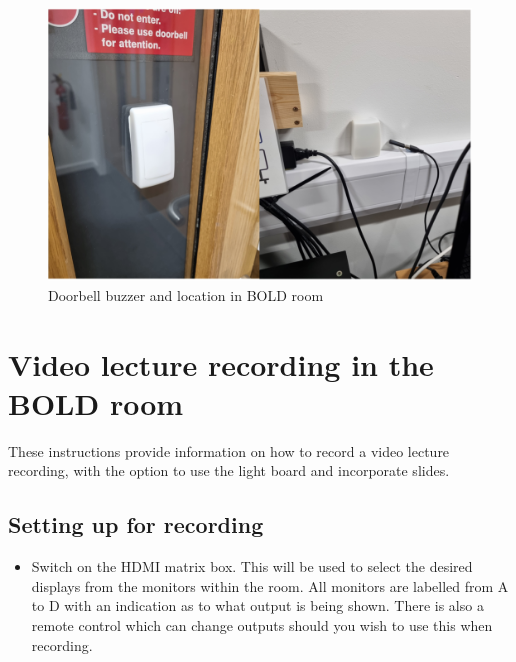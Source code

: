 \documentclass[
]{book}
\providecommand{\tightlist}{%
  \setlength{\itemsep}{0pt}\setlength{\parskip}{0pt}}
\begin{document}
\begin{figure}

{\centering \includegraphics[width=1\linewidth]{Door_buzzer} 

}

\caption{Doorbell buzzer and location in BOLD room}\label{fig:buzzer}
\end{figure}

\hypertarget{intro}{%
\chapter{Video lecture recording in the BOLD room}\label{intro}}

These instructions provide information on how to record a video lecture recording, with the option to use the light board and incorporate slides.

\hypertarget{setting-up-for-recording}{%
\section{Setting up for recording}\label{setting-up-for-recording}}

\begin{itemize}
\tightlist
\item
  Switch on the HDMI matrix box. This will be used to select the desired displays from the monitors within the room. All monitors are labelled from A to D with an indication as to what output is being shown. There is also a remote control which can change outputs should you wish to use this when recording.
\end{itemize}
\end{document}
